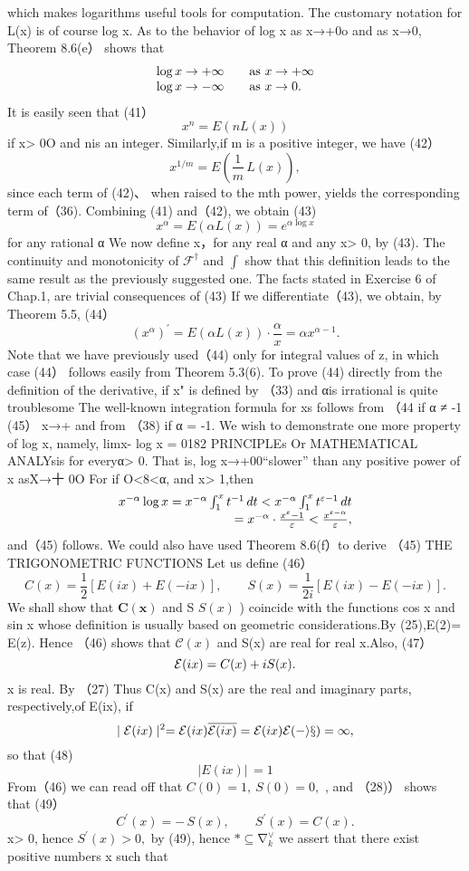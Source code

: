 which makes logarithms useful tools for computation. The customary notation for L(x) is of course log x. As to the behavior of log x as x→+0o and as x→0, Theorem 8.6(e） shows that $$ \begin{array}{r l}{\log x\to+\infty}&{{}\quad{\mathrm{as~}}x\to+\infty}\\ {\log x\to-\infty}&{{}\quad{\mathrm{as~}}x\to0.}\end{array} $$ It is easily seen that (41） $$ x^{n}=E(n L(x)) $$ if x> 0O and nis an integer. Similarly,if m is a positive integer, we have (42） $$ x^{1/m}=E\left(\frac{1}{m}\,L(x)\right)\!, $$ since each term of (42)、 when raised to the mth power, yields the corresponding term of（36). Combining (41) and（42), we obtain (43) $$ x^{\alpha}=E(\alpha L(x))=e^{\alpha\log x} $$ for any rational α We now define x，for any real α and any x> 0, by (43). The continuity and monotonicity of ${\mathcal{F}}^{\dagger}$ and $\textstyle{\int}$ show that this definition leads to the same result as the previously suggested one. The facts stated in Exercise 6 of Chap.1, are trivial consequences of (43) If we differentiate（43), we obtain, by Theorem 5.5, (44） $$ (x^{\alpha})^{\prime}=E(\alpha L(x))\cdot{\frac{\alpha}{x}}=\alpha x^{\alpha-1}. $$ Note that we have previously used（44) only for integral values of z, in which case (44） follows easily from Theorem 5.3(6). To prove (44) directly from the definition of the derivative, if x" is defined by （33) and αis irrational is quite troublesome The well-known integration formula for xs follows from （44 if α ≠ -1 (45） x→+ and from （38) if α = -1. We wish to demonstrate one more property of log x, namely, limx- log x = 0182 PRINCIPLEs Or MATHEMATICAL ANALYsis for everyα> 0. That is, log x→+00“slower” than any positive power of x asX→十 0O For if O<8<α, and x> 1,then $$ \begin{array}{r l}{x^{-\alpha}\log x=x^{-\alpha}\int_{1}^{x}t^{-1}\,d t<x^{-\alpha}\int_{1}^{x}t^{\varepsilon-1}\,d t}\\ {=x^{-\alpha}\cdot{\frac{x^{\varepsilon}-1}{\varepsilon}}<{\frac{x^{\varepsilon-\alpha}}{\varepsilon}},}\end{array} $$ and（45) follows. We could also have used Theorem 8.6(f）to derive （45) THE TRIGONOMETRIC FUNCTIONS Let us define (46） $$ C(x)={\frac{1}{2}}\left[E(i x)+E(-i x)\right],\qquad S(x)={\frac{1}{2i}}\left[E(i x)-E(-i x)\right]. $$ We shall show that ${\boldsymbol{C}}({\boldsymbol{x}})$ and S $S(x)$ ) coincide with the functions cos x and sin x whose definition is usually based on geometric considerations.By (25),E(2)= E(z). Hence （46) shows that ${\mathcal{C}}(x)$ and S(x) are real for real x.Also, (47） $$ {\cal E}(i x)=C(x)+i S(x). $$ x is real. By （27) Thus C(x) and S(x) are the real and imaginary parts, respectively,of E(ix), if $$ \mid{\cal E}(i x)\mid^{2}={\cal E}(i x)\overline{{{\cal E}(i x)}}={\cal E}(i x)\cal E(-i x)=1, $$ so that (48) $$ |E(i x)|\,=1 $$ From（46) we can read off that $C(0)=1,\ S(0)=0,$ , and （28)） shows that (49） $$ C^{\prime}(x)=-\,S(x),\qquad S^{\prime}(x)=C(x). $$ x> 0, hence $S^{\prime}(x)>0,$ by (49), hence $*\subseteq\operatorname{\nabla}_{k}^{\vee}$ we assert that there exist positive numbers x such that 